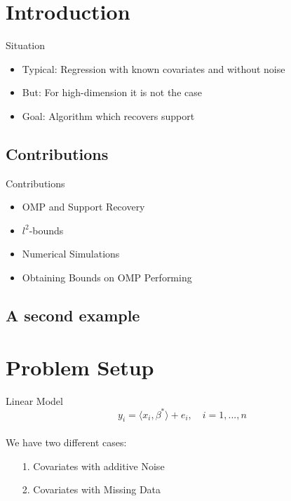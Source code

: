 \documentclass[unknownkeysallowed]{beamer}
\begin{document}
\section{Introduction}
\label{sec:introdcution}
\begin{frame}{Situation}
	\begin{itemize}
		\item Typical: Regression with known covariates and without noise
		\item But: For high-dimension it is not the case
		\item Goal: Algorithm which recovers support
	\end{itemize}
\end{frame}
\subsection{Contributions}

\begin{frame}{Contributions}
	\begin{itemize}
		\item OMP and Support Recovery
		\item $l^2$-bounds
		\item Numerical Simulations
		\item Obtaining Bounds on OMP Performing
	\end{itemize}
\end{frame}


\subsection{A second example}
\label{sub:deuxiem_exmple}
\section{Problem Setup}
\begin{frame}{Linear Model}
	\begin{equation*}
	y_i = \langle x_i,\beta^*\rangle + e_i, \quad	i=1,...,n
	\end{equation*}\ \\
	We have two different cases:
	\begin{itemize}
		\item[1.] Covariates with additive Noise
		\item[2.] Covariates with Missing Data
	\end{itemize}
\end{frame}
\end{document}
